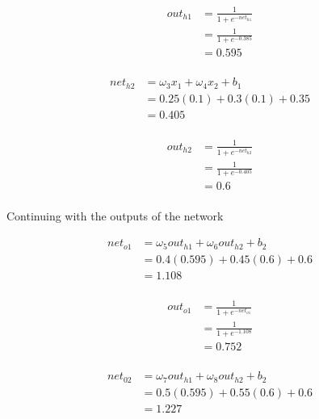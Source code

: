 \documentclass[10pt,a4paper]{article}
\begin{document}
\begin{equation}
\begin{split}
out_{h1} &= \frac{1}{1+e^{-net_{h1}}}\\ 
         &= \frac{1}{1+e^{-0.385}}\\ 
         &= 0.595\\
\end{split}
\end{equation}

\begin{equation}
\begin{split}
net_{h2} &= \omega_3 x_1 + \omega_4 x_2 + b_1 \\
         &= 0.25(0.1) + 0.3(0.1) + 0.35 \\
         &= 0.405\\
\end{split}
\end{equation}

\begin{equation}
\begin{split}
out_{h2} &= \frac{1}{1+e^{-net_{h2}}}\\ 
         &= \frac{1}{1+e^{-0.405}}\\ 
         &= 0.6\\
\end{split}
\end{equation}

Continuing with the outputs of the network

\begin{equation}
\begin{split}
net_{o1} &= \omega_5 out_{h1} + \omega_6 out_{h2} + b_2 \\
         &= 0.4(0.595) + 0.45(0.6) + 0.6 \\
         &= 1.108\\
\end{split}
\end{equation}

\begin{equation}
\begin{split}
out_{o1} &= \frac{1}{1+e^{-net_{o1}}}\\ 
         &= \frac{1}{1+e^{-1.108}}\\ 
         &= 0.752\\
\end{split}
\end{equation}

\begin{equation}
\begin{split}
net_{02} &= \omega_7 out_{h1} + \omega_8 out_{h2} + b_2 \\
         &= 0.5(0.595) + 0.55(0.6) + 0.6 \\
         &= 1.227\\
\end{split}
\end{equation}
\end{document}
